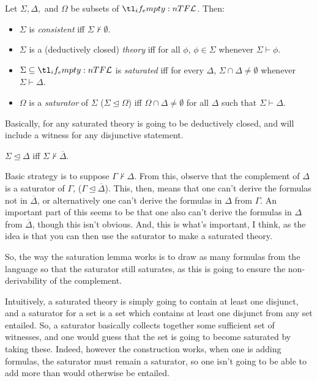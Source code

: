 \documentclass[10pt]{article}
\begin{document}
\begin{definition}
  Let \(\Sigma, \Delta,\) and \(\Omega\) be subsets of \(\olang{}\). Then:
  \begin{itemize}
  \item \(\Sigma\) is \emph{consistent} iff \(\Sigma \nvdash \emptyset\).
  \item \(\Sigma\) is a (deductively closed) \emph{theory} iff for all \(\phi\), \(\phi \in \Sigma\) whenever \(\Sigma \vdash \phi\).
  \item \(\Sigma \subseteq \olang{}\) is \emph{saturated} iff for every \(\Delta\), \(\Sigma \cap \Delta \ne \emptyset\) whenever \(\Sigma \vdash \Delta\).
  \item \(\Omega\) is a \emph{saturator} of \(\Sigma\) (\(\Sigma \unlhd \Omega\)) iff \(\Omega \cap \Delta \ne \emptyset\) for all \(\Delta\) such that \(\Sigma \vdash \Delta\).
  \end{itemize}
\end{definition}
Basically, for any saturated theory is going to be deductively closed, and will include a witness for any disjunctive statement.

\begin{fact}
  \(\Sigma \unlhd \Delta\) iff \(\Sigma \nvdash \overline{\Delta}\).
\end{fact}

Basic strategy is to suppose \(\Gamma \nvdash \Delta\).
From this, observe that the complement of \(\Delta\) is a saturator of \(\Gamma\), (\(\Gamma \unlhd \overline{\Delta}\)).
This, then, means that one can't derive the formulas not in \(\overline{\Delta}\), or alternatively one can't derive the formulas in \(\Delta\) from \(\Gamma\).
An important part of this seems to be that one also can't derive the formulas in \(\Delta\) from \(\overline{\Delta}\), though this isn't obvious.
And, this is what's important, I think, as the idea is that you can then use the saturator to make a saturated theory.

So, the way the saturation lemma works is to draw as many formulas from the language so that the saturator still saturates, as this is going to ensure the non-derivability of the complement.

Intuitively, a saturated theory is simply going to contain at least one disjunct, and a saturator for a set is a set which contains at least one disjunct from any set entailed.
So, a saturator basically collects together some sufficient set of witnesses, and one would guess that the set is going to become saturated by taking these.
Indeed, however the construction works, when one is adding formulas, the saturator must remain a saturator, so one isn't going to be able to add more than would otherwise be entailed.
\end{document}
